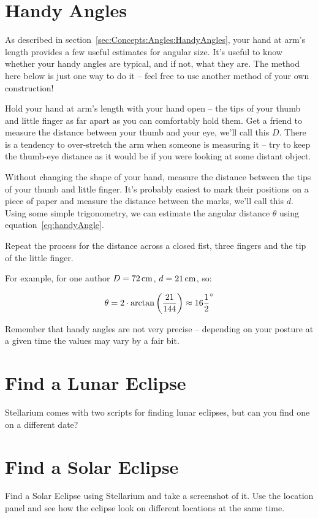 \section{Handy Angles}
\label{sec:Exercises:handyAngles}


As described in section~\ref{sec:Concepts:Angles:HandyAngles}, 
your hand at arm's length provides a few useful estimates for angular
size. It's useful to know whether your handy angles are typical, and if not,
what they are. The method here below is just one way to do it -- feel
free to use another method of your own construction!

Hold your hand at arm's length with your hand open -- the tips of your
thumb and little finger as far apart as you can comfortably hold them.
Get a friend to measure the distance between your thumb and your eye,
we'll call this $D$. There is a tendency to over-stretch the arm
when someone is measuring it -- try to keep the thumb-eye distance as it
would be if you were looking at some distant object.

Without changing the shape of your hand, measure the distance between
the tips of your thumb and little finger. It's probably easiest to mark
their positions on a piece of paper and measure the distance between the
marks, we'll call this $d$. Using some simple trigonometry, we can
estimate the angular distance $\theta$ using equation~\eqref{eq:handyAngle}.

Repeat the process for the distance across a closed fist, three fingers
and the tip of the little finger.

For example, for one author $D=72\cm$, $d=21\cm$, so:

\begin{equation}
\theta = 2 \cdot \arctan{\left( \frac{21}{144} \right)} \approx 16 \frac{1}{2}\degree
\end{equation}

Remember that handy angles are not very precise -- depending on your
posture at a given time the values may vary by a fair bit.

\section{Find a Lunar Eclipse}
\label{sec:Exercises:LunarEclipse}

Stellarium comes with two scripts for finding lunar eclipses, but can
you find one on a different date?

\section{Find a Solar Eclipse}
\label{sec:Exercises:SolarEclipse}

Find a Solar Eclipse using Stellarium and take a screenshot of it. Use
the location panel and see how the eclipse look on different locations
at the same time.



